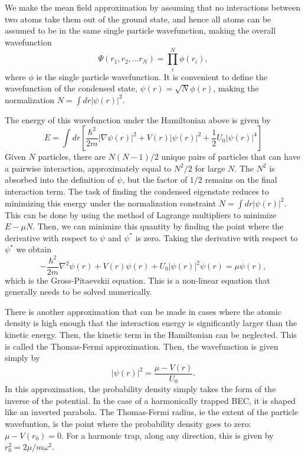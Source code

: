 We make the mean field approximation by assuming that no interactions between two atoms take them out of the ground state, and hence all atoms can be assumed to be in the same single particle wavefunction, making the overall wavefunction
\begin{equation}
\Psi(r_1,r_2,...r_N)=\prod_i^N \phi(r_i),
\end{equation}
where $\phi$ is the single particle wavefunction. It is convenient to define the wavefunction of the condensed state, $\psi(r) = \sqrt{N}\phi(r)$, making the normalization $N=\int dr |\psi(r)|^2$.

The energy of this wavefunction under the Hamiltonian above is given by
\begin{equation}
E=\int dr\left[ \frac{\hbar^2}{2m}|\nabla\psi(r)|^2 + V(r)|\psi(r)|^2 + \frac{1}{2}U_0|\psi(r)|^4\right]
\end{equation}
Given $N$ particles, there are $N(N-1)/2$ unique pairs of particles that can have a pairwise interaction, approximately equal to $N^2/2$ for large $N$. The $N^2$ is absorbed into the definition of $\psi$, but the factor of $1/2$ remains on the final interaction term. The task of finding the condensed eigenstate reduces to minimizing this energy under the normalization constraint $N=\int dr |\psi(r)|^2$. This can be done by using the method of Lagrange multipliers to minimize $E-\mu N$. Then, we can minimize this quantity by finding the point where the derivative with respect to $\psi$ and $\psi^*$ is zero. Taking the derivative with respect to $\psi^*$ we obtain 
\begin{equation}
-\frac{\hbar^2}{2m} \nabla^2 \psi(r) + V(r)\psi(r) + U_0 |\psi(r)|^2\psi(r) = \mu \psi(r),
\end{equation}
which is the Gross-Pitaevskii equation. This is a non-linear equation that generally needs to be solved numerically.

There is another approximation that can be made in cases where the atomic density is high enough that the interaction energy is significantly larger than the kinetic energy. Then, the kinetic term in the Hamiltonian can be neglected. This is called the Thomas-Fermi approximation. Then, the wavefunction is given simply by
\begin{equation}
|\psi(r)|^2 = \frac{\mu - V(r)}{U_0}.
\end{equation}
In this approximation, the probability density simply takes the form of the inverse of the potential. In the case of a harmonically trapped BEC, it is shaped like an inverted parabola. The Thomas-Fermi radius, ie the extent of the particle wavefuntion, is the point where the probability density goes to zero: $\mu - V(r_0) = 0$. For a harmonic trap, along any direction, this is given by $r_0^2 = 2\mu/m\omega^2$. 

